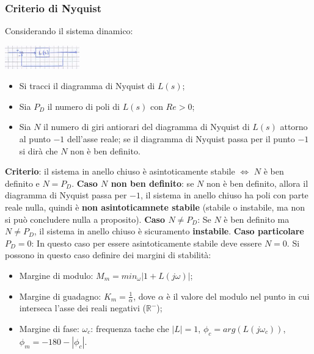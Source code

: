 \begin{landscape}
\begin{multicols*}{3}
    \subsubsection*{Criterio di Nyquist}
    Considerando il sistema dinamico:
    \begin{center}
        \includegraphics[height=1cm]{../formulario/img1.JPG}
    \end{center}
    \begin{itemize}
        \item Si tracci il diagramma di Nyquist di $L(s)$;
        \item Sia $P_D$ il numero di poli di $L(s)$ con $Re > 0$;
        \item Sia $N$ il numero di giri antiorari del diagramma di Nyquist di $L(s)$ attorno al punto $-1$ dell'asse reale; se il diagramma di Nyquist passa per il punto $-1$ si dirà che $N$ non è ben definito.
    \end{itemize}
    \textbf{Criterio}: il sistema in anello chiuso è asintoticamente stabile $\Leftrightarrow$ $N$ è ben definito e $N = P_D$.\newline
    \textbf{Caso $N$ non ben definito}:\newline
    se $N$ non è ben definito, allora il diagramma di Nyquist passa per $-1$, il sistema in anello chiuso ha poli con parte reale nulla, quindi è \textbf{non asintoticamnete stabile} (stabile o instabile, ma non si può concludere nulla a proposito).\newline
    \textbf{Caso $N \neq P_D$}:\newline
    Se $N$ è ben definito ma $N\neq P_D$, il sistema in anello chiuso è sicuramento \textbf{instabile}.\newline
    \textbf{Caso particolare $P_D = 0$}:\newline
    In questo caso per essere asintoticamente stabile deve essere $N = 0$. Si possono in questo caso definire dei margini di stabilità:
    \begin{itemize}
        \item Margine di modulo: $M_m = min_{\omega} | 1 + L(j \omega)|$;
        \item Margine di guadagno: $K_m = \frac{1}{\alpha}$, dove $\alpha$ è il valore del modulo nel punto in cui interseca l'asse dei reali negativi ($\mathbb{R}^{-}$);
        \item Margine di fase: $\omega_c$: frequenza tache che $|L| = 1$, $\phi_c = arg(L(j \omega_c))$, $\phi_m = -180 - |\phi_c|$.
    \end{itemize}

\end{multicols*}
\end{landscape}

